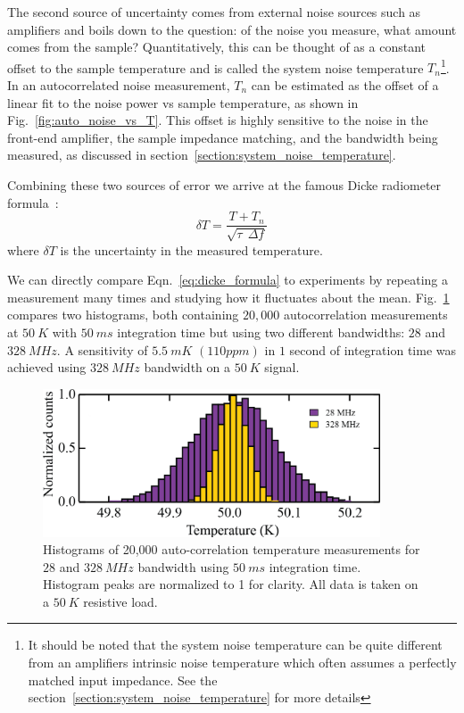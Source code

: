 The second source of uncertainty comes from external noise sources such as amplifiers and boils down to the question: of the noise you measure, what amount comes from the sample? Quantitatively, this can be thought of as a constant offset to the sample temperature and is called the system noise temperature $T_n$\footnote{It should be noted that the system noise temperature can be quite different from an amplifiers intrinsic noise temperature which often assumes a perfectly matched input impedance. See the section~\ref{section:system_noise_temperature} for more details}. In an autocorrelated noise measurement, $T_n$ can be estimated as the offset of a linear fit to the noise power vs sample temperature, as shown in Fig.~\ref{fig:auto_noise_vs_T}. This offset is highly sensitive to the noise in the front-end amplifier, the sample impedance matching, and the bandwidth being measured, as discussed in section~\ref{section:system_noise_temperature}.

Combining these two sources of error we arrive at the famous Dicke radiometer formula~\cite{dicke_measurement_1946}:
\begin{equation}\label{eq:dicke_formula}
\delta T = \frac{T+T_n}{\sqrt{\tau~~\Delta f}}
\end{equation}
where $\delta T$ is the uncertainty in the measured temperature.

We can directly compare Eqn.~\ref{eq:dicke_formula} to experiments by repeating a measurement many times and studying how it fluctuates about the mean. Fig.~\ref{fig:JNT_histograms} compares two histograms, both containing $20,000$ autocorrelation measurements at $50~K$ with $50~ms$ integration time but using two different bandwidths: $28$ and $328~MHz$. A sensitivity of $5.5~mK$ $(110 ppm)$ in $1$ second of integration time was achieved using $328~MHz$ bandwidth on a $50~K$ signal.
\begin{figure}
\centering
\includegraphics[width = 100mm]{figures/Johnson_noise_thermometry/histograms.png}
\caption{Histograms of 20,000 auto-correlation temperature measurements for $28$ and $328~MHz$ bandwidth using $50~ms$ integration time. Histogram peaks are normalized to 1 for clarity. All data is taken on a $50~K$ resistive load.}
\label{fig:JNT_histograms}
\end{figure}

